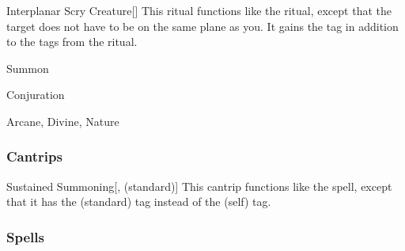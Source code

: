 \lowercase{\hypertarget{spell:Interplanar Scry Creature}{}}\label{spell:Interplanar Scry Creature}
\begin{apability}[\nth{7}]{\hypertarget{spell:Interplanar Scry Creature}{Interplanar Scry Creature}}[]
This ritual functions like the  ritual, except that the target does not have to be on the same plane as you.
It gains the  tag in addition to the tags from the  ritual.
\end{apability}
\vspace{0.25em}


\newpage
\begin{spellsection}{Summon}

\begin{spellheader}
\end{spellheader}


 Conjuration

 Arcane, Divine, Nature

\subsubsection{Cantrips}


\begin{freeability}{Sustained Summoning}[,  (standard)]
This cantrip functions like the  spell, except that it has the  (standard) tag instead of the  (self) tag.
\end{freeability}

\end{spellsection}


\subsubsection{Spells}


